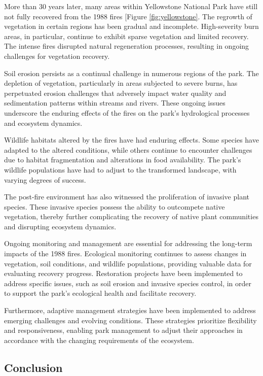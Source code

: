 \documentclass[
  12 pt,
]{Nemilov}
\begin{document}
More than 30 years later, many areas within Yellowstone National Park have still not fully recovered from the 1988 fires {[}Figure \ref{fig:yellowstone}\citep{li2022analyzing, nasa-yellowstone, romme2004ten, romme2011twenty}. The regrowth of vegetation in certain regions has been gradual and incomplete. High-severity burn areas, in particular, continue to exhibit sparse vegetation and limited recovery. The intense fires disrupted natural regeneration processes, resulting in ongoing challenges for vegetation recovery.

Soil erosion persists as a continual challenge in numerous regions of the park. The depletion of vegetation, particularly in areas subjected to severe burns, has perpetuated erosion challenges that adversely impact water quality and sedimentation patterns within streams and rivers. These ongoing issues underscore the enduring effects of the fires on the park's hydrological processes and ecosystem dynamics.

Wildlife habitats altered by the fires have had enduring effects. Some species have adapted to the altered conditions, while others continue to encounter challenges due to habitat fragmentation and alterations in food availability. The park's wildlife populations have had to adjust to the transformed landscape, with varying degrees of success.

The post-fire environment has also witnessed the proliferation of invasive plant species. These invasive species possess the ability to outcompete native vegetation, thereby further complicating the recovery of native plant communities and disrupting ecosystem dynamics.

Ongoing monitoring and management are essential for addressing the long-term impacts of the 1988 fires. Ecological monitoring continues to assess changes in vegetation, soil conditions, and wildlife populations, providing valuable data for evaluating recovery progress. Restoration projects have been implemented to address specific issues, such as soil erosion and invasive species control, in order to support the park's ecological health and facilitate recovery.

Furthermore, adaptive management strategies have been implemented to address emerging challenges and evolving conditions. These strategies prioritize flexibility and responsiveness, enabling park management to adjust their approaches in accordance with the changing requirements of the ecosystem.

\subsection{Conclusion}\label{conclusion}
\end{document}
